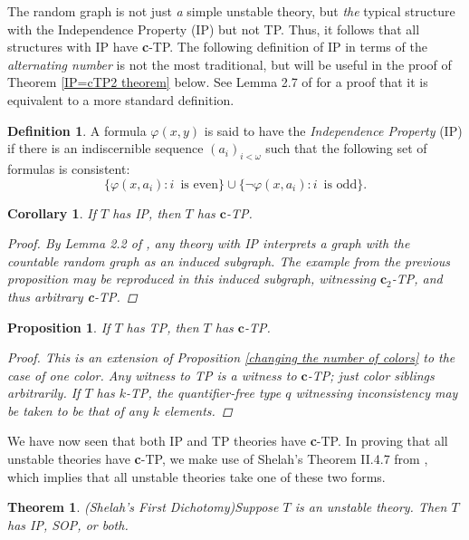\documentclass{article}
\newcommand{\vphi}{\varphi}
\newtheorem{theorem}{Theorem}
\newtheorem{corollary}{Corollary}
\newtheorem{proposition}{Proposition}
\theoremstyle{definition}
\newtheorem{definition}{Definition}
\theoremstyle{definition}
\theoremstyle{definition}
\theoremstyle{definition}
\begin{document}
The random graph is not just \textit{a} simple unstable theory, but \textit{the} typical structure with the Independence Property (IP) but not TP. Thus, it follows that all structures with IP have \textbf{c}-TP. The following definition of IP in terms of the \textit{alternating number} is not the most traditional, but will be useful in the proof of Theorem \ref{IP=cTP2 theorem} below. See Lemma 2.7 of \cite{Simon_2015} for a proof that it is equivalent to a more standard definition.

\begin{definition}
    A formula $\vphi(x,y)$ is said to have the \textit{Independence Property} (IP) if there is an indiscernible sequence $(a_i)_{i<\omega}$ such that the following set of formulas is consistent: $$\{\vphi(x,a_i)\colon i\enspace\text{is even}\}\cup\{\neg\vphi(x,a_i)\colon i\enspace\text{is odd}\}.$$
\end{definition}


\begin{corollary}{}
If $T$ has IP, then $T$ has $\textbf{c}$-TP.
\begin{proof}
   By Lemma 2.2 of \cite{Laskowski_Shelah_Karp_complexity_IP}, any theory with IP interprets a graph with the countable random graph as an induced subgraph. The example from the previous proposition may be reproduced in this induced subgraph, witnessing $\textbf{c}_2$-TP, and thus arbitrary \textbf{c}-TP.
\end{proof}
\end{corollary}

\begin{proposition}{}
 If $T$ has TP, then $T$ has $\textbf{c}$-TP.

\begin{proof}
    This is an extension of Proposition \ref{changing the number of colors} to the case of one color. Any witness to TP is a witness to $\textbf{c}$-TP; just color siblings arbitrarily. If $T$ has $k$-TP, the quantifier-free type $q$ witnessing inconsistency may be taken to be that of any $k$ elements.
\end{proof}
\end{proposition}

We have now seen that both IP and TP theories have \textbf{c}-TP. In proving that all unstable theories have \textbf{c}-TP, we make use of Shelah's Theorem II.4.7 from \cite{shelah_classification_1990}, which implies that all unstable theories take one of these two forms.

\begin{theorem}{(Shelah's First Dichotomy)}\label{first dichotomy}
    Suppose $T$ is an unstable theory. Then $T$ has IP, SOP, or both.
\end{theorem}
\end{document}
